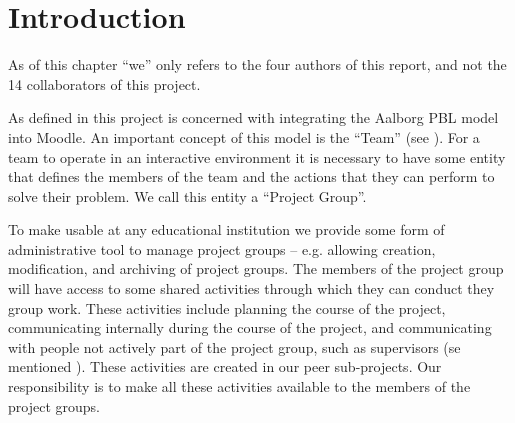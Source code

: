 \chapter{Introduction}
\label{chap:introProjectgroup}
As of this chapter ``we'' only refers to the four authors of this report, and not the 14 collaborators of this project.

As defined in  this project is concerned with integrating the Aalborg PBL model into Moodle.
An important concept of this model is the ``Team'' (see ).
For a team to operate in an interactive environment it is necessary to have some entity that defines the members of the team and the actions that they can perform to solve their problem.
We call this entity a ``Project Group''.

To make \system{} usable at any educational institution we provide some form of administrative tool to manage project groups -- e.g. allowing  creation, modification, and archiving of project groups.
The members of the project group will have access to some shared activities through which they can conduct they group work.
These activities include planning the course of the project, communicating internally during the course of the project, and communicating with people not actively part of the project group, such as supervisors (se mentioned ).
These activities are created in our peer sub-projects.
Our responsibility is to make all these activities available to the members of the project groups.
